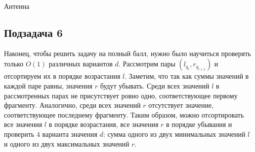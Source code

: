 \begin{tutorial}{Антенна}
\subsection*{Подзадача 6}
Наконец, чтобы решить задачу на полный балл, нужно было научиться проверять только $O(1)$ различных вариантов $d$. Рассмотрим пары $(l_{q_i}, r_{q_{i + 1}})$ и отсортируем их в порядке возрастания $l$. Заметим, что так как суммы значений в каждой паре равны, значения $r$ будут убывать. Среди всех значений $l$ в рассмотренных парах не присутствует ровно одно, соответствующее первому фрагменту. Аналогично, среди всех значений $r$ отсутствует значение, соответствующее последнему фрагменту. Таким образом, можно отсортировать все значения $l$ в порядке возрастания, все значения $r$ в порядке убывания и проверить $4$ варианта значения $d$: сумма одного из двух минимальных значений $l$ и одного из двух максимальных значений $r$.

\end{tutorial}
